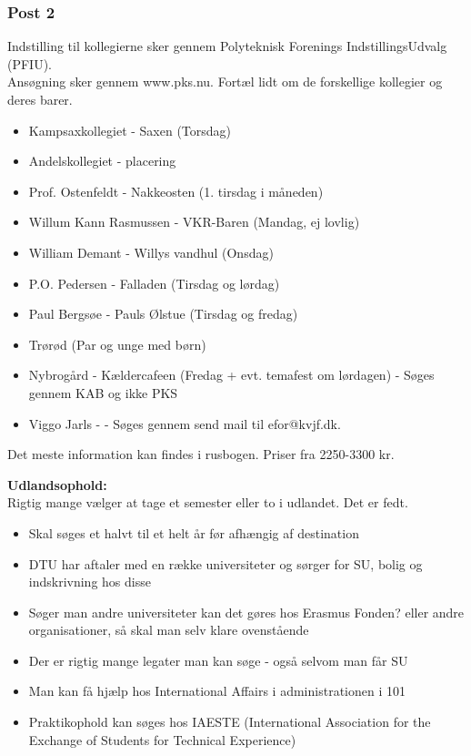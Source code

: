 \subsubsection{Post 2}
Indstilling til kollegierne sker gennem Polyteknisk Forenings IndstillingsUdvalg (PFIU).\\
Ansøgning sker gennem www.pks.nu. Fortæl lidt om de forskellige kollegier og deres barer.
\begin{multicols}{2}
\begin{itemize}
 \item Kampsaxkollegiet - Saxen (Torsdag)
 \item Andelskollegiet - placering
 \item Prof. Ostenfeldt - Nakkeosten (1. tirsdag i måneden)
 \item Willum Kann Rasmussen - VKR-Baren (Mandag, ej lovlig)
 \item William Demant - Willys vandhul (Onsdag)
 \item P.O. Pedersen - Falladen (Tirsdag og lørdag)
 \item Paul Bergsøe - Pauls Ølstue (Tirsdag og fredag)
 \item Trørød (Par og unge med børn)
 \item Nybrogård - Kældercafeen (Fredag + evt. temafest om lørdagen) - Søges gennem KAB og ikke PKS
 \item Viggo Jarls -  - Søges gennem send mail til efor@kvjf.dk.
\end{itemize}
\end{multicols}
Det meste information kan findes i rusbogen. Priser fra 2250-3300 kr.

\textbf{Udlandsophold:}\\
Rigtig mange vælger at tage et semester eller to i udlandet. Det er fedt.
\begin{itemize}
\item Skal søges et halvt til et helt år før afhængig af destination
\item DTU har aftaler med en række universiteter og sørger for SU, bolig og indskrivning hos disse
\item Søger man andre universiteter kan det gøres hos Erasmus Fonden? eller andre organisationer, så skal man selv klare ovenstående
\item Der er rigtig mange legater man kan søge - også selvom man får SU
\item Man kan få hjælp hos International Affairs i administrationen i 101
\item Praktikophold kan søges hos IAESTE (International Association for the Exchange of Students for Technical Experience)
\end{itemize}

